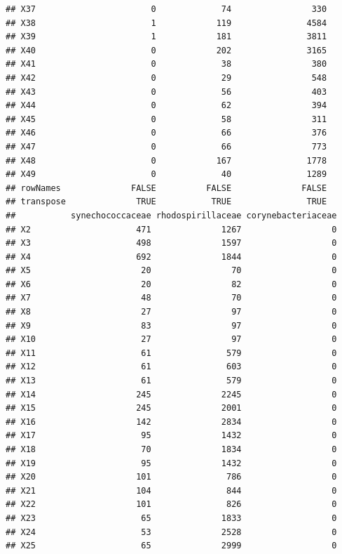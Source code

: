 \documentclass[12pt]{beamer}\usepackage[]{graphicx}\usepackage[]{color}
\makeatletter
\newenvironment{kframe}{%
 \def\at@end@of@kframe{}%
 \ifinner\ifhmode%
  \def\at@end@of@kframe{\end{minipage}}%
  \begin{minipage}{\columnwidth}%
 \fi\fi%
 \def\FrameCommand##1{\hskip\@totalleftmargin \hskip-\fboxsep
 \colorbox{shadecolor}{##1}\hskip-\fboxsep
     \hskip-\linewidth \hskip-\@totalleftmargin \hskip\columnwidth}%
 \MakeFramed {\advance\hsize-\width
   \@totalleftmargin\z@ \linewidth\hsize
   \@setminipage}}%
 {\par\unskip\endMakeFramed%
 \at@end@of@kframe}
\newenvironment{knitrout}{}{} %
\makeatother
\begin{document}
\begin{frame}[fragile]
\begin{knitrout}
\begin{kframe}
\begin{verbatim}
## X37                       0             74                330
## X38                       1            119               4584
## X39                       1            181               3811
## X40                       0            202               3165
## X41                       0             38                380
## X42                       0             29                548
## X43                       0             56                403
## X44                       0             62                394
## X45                       0             58                311
## X46                       0             66                376
## X47                       0             66                773
## X48                       0            167               1778
## X49                       0             40               1289
## rowNames              FALSE          FALSE              FALSE
## transpose              TRUE           TRUE               TRUE
##           synechococcaceae rhodospirillaceae corynebacteriaceae
## X2                     471              1267                  0
## X3                     498              1597                  0
## X4                     692              1844                  0
## X5                      20                70                  0
## X6                      20                82                  0
## X7                      48                70                  0
## X8                      27                97                  0
## X9                      83                97                  0
## X10                     27                97                  0
## X11                     61               579                  0
## X12                     61               603                  0
## X13                     61               579                  0
## X14                    245              2245                  0
## X15                    245              2001                  0
## X16                    142              2834                  0
## X17                     95              1432                  0
## X18                     70              1834                  0
## X19                     95              1432                  0
## X20                    101               786                  0
## X21                    104               844                  0
## X22                    101               826                  0
## X23                     65              1833                  0
## X24                     53              2528                  0
## X25                     65              2999                  0

\end{verbatim}
\end{kframe}
\end{knitrout}
\end{frame}
\end{document}
